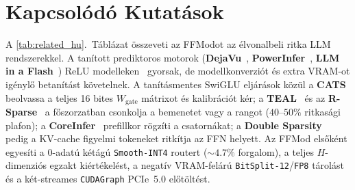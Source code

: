 \documentclass[10pt,twocolumn]{article}
\begin{document}
\section{Kapcsolódó Kutatások}
\label{sec:related_hu}

A \ref{tab:related_hu}.\ Táblázat összeveti az FFModot az élvonalbeli ritka LLM rendszerekkel. A tanított prediktoros motorok (\textbf{DejaVu}~\cite{liu2023dejavu}, \textbf{PowerInfer}~\cite{song2024powerinfer}, \textbf{LLM in a Flash}~\cite{alizadeh2024llmflash}) ReLU modelleken~\cite{mirzadeh2024relustrikesback} gyorsak, de modellkonverziót és extra VRAM-ot igénylő betanítást követelnek. A tanításmentes SwiGLU eljárások közül a \textbf{CATS}~\cite{lee2024cats} beolvassa a teljes 16 bites $W_{\mathrm{gate}}$ mátrixot és kalibrációt kér; a \textbf{TEAL}~\cite{liu2025teal} és az \textbf{R-Sparse}~\cite{zhang2025rsparse} a főszorzatban csonkolja a bemenetet vagy a rangot ($40\text{--}50\%$ ritkasági plafon); a \textbf{CoreInfer}~\cite{wang2025coreinfer} prefillkor rögzíti a csatornákat; a \textbf{Double Sparsity}~\cite{yang2024doublesparsity} pedig a KV-cache figyelmi tokeneket ritkítja az FFN helyett. Az FFMod elsőként egyesíti a 0-adatú kétágú \texttt{Smooth-INT4} routert ($\sim 4.7\%$ forgalom), a teljes $H$-dimenziós egzakt kiértékelést, a negatív VRAM-felárú \texttt{BitSplit-12}/\texttt{FP8} tárolást és a két-streames \texttt{CUDAGraph} PCIe~5.0 előtöltést.

\begin{table}[t]
  \centering
  \caption{Architektúrális összevetés a legfontosabb ritka LLM futtatórendszerekkel.}
  \label{tab:related_hu}
\end{table}
\end{document}

